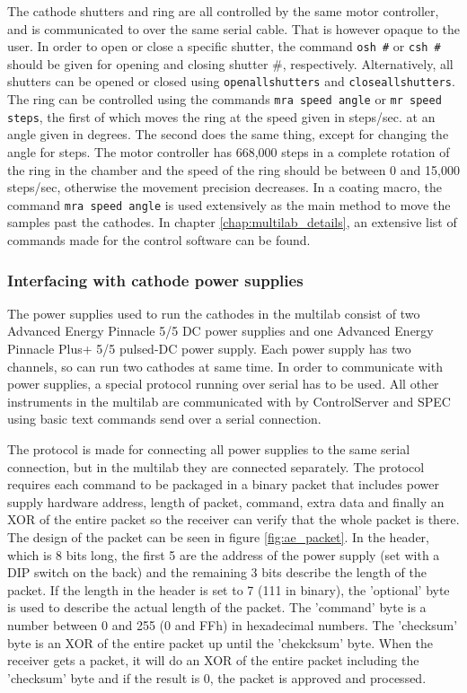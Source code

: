 The cathode shutters and ring are all controlled by the same motor controller, and is communicated to over the same serial cable. That is however opaque to the user. In order to open or close a specific shutter, the command \verb'osh #' or \verb'csh #' should be given for opening and closing shutter \#, respectively. Alternatively, all shutters can be opened or closed using \verb'openallshutters' and \verb'closeallshutters'. The ring can be controlled using the commands \verb'mra speed angle' or \verb'mr speed steps', the first of which moves the ring at the speed given in steps/sec. at an angle given in degrees. The second does the same thing, except for changing the angle for steps. The motor controller has 668,000 steps in a complete rotation of the ring in the chamber and the speed of the ring should be between 0 and 15,000 steps/sec, otherwise the movement precision decreases. In a coating macro, the command \verb'mra speed angle' is used extensively as the main method to move the samples past the cathodes. In chapter \ref{chap:multilab_details}, an extensive list of commands made for the control software can be found.

\subsubsection{Interfacing with cathode power supplies}
The power supplies used to run the cathodes in the multilab consist of two Advanced Energy Pinnacle 5/5 DC power supplies and one Advanced Energy Pinnacle Plus+ 5/5 pulsed-DC power supply. Each power supply has two channels, so can run two cathodes at same time. In order to communicate with power supplies, a special protocol running over serial has to be used. All other instruments in the multilab are communicated with by ControlServer and SPEC using basic text commands send over a serial connection.

The protocol is made for connecting all power supplies to the same serial connection, but in the multilab they are connected separately. The protocol requires each command to be packaged in a binary packet that includes power supply hardware address, length of packet, command, extra data and finally an XOR of the entire packet so the receiver can verify that the whole packet is there. The design of the packet can be seen in figure \ref{fig:ae_packet}. In the header, which is 8 bits long, the first 5 are the address of the power supply (set with a DIP switch on the back) and the remaining 3 bits describe the length of the packet. If the length in the header is set to 7 (111 in binary), the 'optional' byte is used to describe the actual length of the packet. The 'command' byte is a number between 0 and 255 (0 and FFh) in hexadecimal numbers. The 'checksum' byte is an XOR of the entire packet up until the 'chekcksum' byte. When the receiver gets a packet, it will do an XOR of the entire packet including the 'checksum' byte and if the result is 0, the packet is approved and processed.

